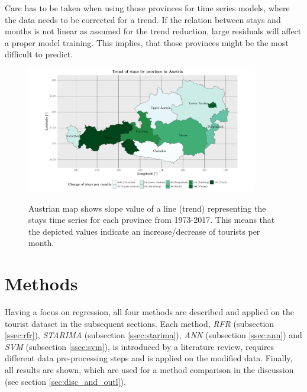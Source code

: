 \documentclass[a4paper,reqno,]{article}
\begin{document}
Care has to be taken when using those provinces for time series models, where the data needs to be corrected for a trend. If the relation between stays and months is not linear as assumed for the trend reduction, large residuals will affect a proper model training. This implies, that those provinces might be the most difficult to predict.       
\begin{figure}[h!]
\begin{minipage}[b]{1\textwidth}
\centering
    \includegraphics[width=0.9\textwidth]{images/EA/provinces_stays_trend.pdf}
    \caption{Austrian map shows slope value of a line (trend) representing the stays time series for each province from 1973-2017. This means that the depicted values indicate an increase/decrease of tourists per month.}\label{fig:trend_stays}
\label{fig:tourist_trend_map}
\end{minipage}
\end{figure} 
\newpage
\section{Methods}
\label{sec:methods}
Having a focus on regression, all four methods are described and applied on the tourist dataset in the subsequent sections. Each method, \textit{RFR} (subsection \ref{ssec:rfr}), \textit{STARIMA} (subsection \ref{ssec:starima}), \textit{ANN} (subsection \ref{ssec:ann}) and \textit{SVM} (subsection \ref{ssec:svm}), is introduced by a literature review, requires different data pre-processing steps and is applied on the modified data. Finally, all results are shown, which are used for a method comparison in the discussion (see section \ref{sec:disc_and_outl}).  
\end{document}
